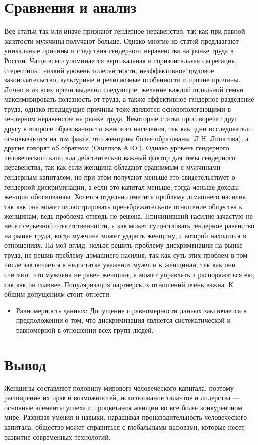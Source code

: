 \documentclass[a4paper,14pt]{article}
\begin{document}
\section{Сравнения и анализ}
Все статьи так или иначе признают гендерное неравенство, так как при равной занятости мужчины получают больше. Однако многие из статей предлаагают уникальные причины и следствия гендерного неравенства на рынке труда в России. Чаще всего упоминается вертикальная и горизонтальная сегрегация, стереотипы, низкий уровень толерантности, неэффективное трудовое законодательство, культурные и религиозные особенности и прочие причины. Лично я из всех причн выделил следующие: желание каждой отдельной семьи максимизировать полезность от труда, а также эффективное гендерное разделение труда, однако предыдущие причины тоже являются основопологающими в гендерном неравенстве на рынке труда. Некоторые статьи противоречат друг другу в вопросе образованности женского населения, так как одни исследователи основываются на том факте, что женщины более образованы (Л.Н. Липатова), а другие говорят об обратном (Ощепков А.Ю.). Однако уровень гендерного человеческого капитала действительно важный фактор для темы гендерного неравенства, так как если женщина обладают сравнимым с мужчинами гендерным капиталом, но при этом получают меньше это свидетельствует о гендерной дискриминации, а если это капитал меньше, тогда меньше доходы женщин обоснованны. Хочется отдельно ометить проблему домашнего насилия, так как она может иллюстрировать пренебрежительное отношение общества к женщинам, ведь проблема отнюдь не решена. Причинивший насилие зачастую не несет серьезной ответтственности, а как может существовать гендерное равенство на рынке труда, когда мужчина может ударить женщину, с которой находится в отношениях. На мой вгляд, нельзя решить проблему дискриминации на рынке труда, не решив проблему домашнего насилия, так как суть этих проблем в том числе заключается в недостатке уважения мужчин к женщинам, так как они считают, что мужчина не равен женщине, а может управлять и распоряжаться ею, так как он главнее. Популяризация партнерских отношений очень важна.
К общим допущениям стоит отнести:
\begin{itemize}
    \item Равномерность данных: Допущение о равномерности данных заключается в предположении о том, что дискриминация является систематической и равномерной в отношении всех групп людей.
\end{itemize}
\section{Вывод}
Женщины составляют половину мирового человеческого капитала, поэтому расширение их прав и возможностей, использование талантов и лидерства — основные элементы успеха и процветания женщин во все более конкурентном мире. Развивая умения и навыки, наращивая производительность человеческого капитала, общество может справиться с глобальными вызовами, которые несет развитие современных технологий. 
\end{document}
